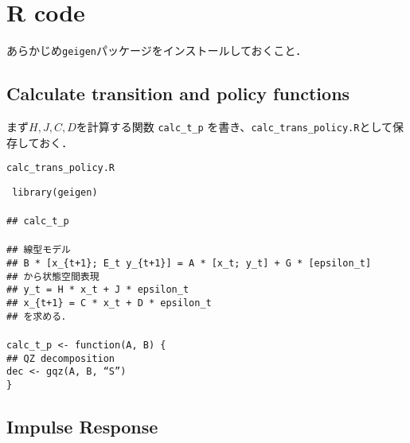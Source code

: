 \documentclass[a4j, dvipdfmx]{jarticle}
\begin{document}
\section{R code}

あらかじめ{\tt geigen}パッケージをインストールしておくこと．

\subsection{Calculate transition and policy functions}
まず$H,J,C,D$を計算する関数 {\tt calc\_t\_p} を書き、{\tt calc\_trans\_policy.R}として保存しておく．\\

\begin{itembox}[l]{{\tt calc\_trans\_policy.R}}

\noindent
{\tt
library(geigen)\\
\\
\#\# calc\_t\_p \\
\\
\#\# 線型モデル \\
\#\# B * [x\_\{t+1\}; E\_t y\_\{t+1\}] = A * [x\_t; y\_t] + G * [epsilon\_t] \\
\#\# から状態空間表現 \\
\#\# y\_t = H * x\_t + J * epsilon\_t \\
\#\# x\_\{t+1\} = C * x\_t + D * epsilon\_t\\
\#\# を求める．\\
\\
calc\_t\_p <- function(A, B) \{\\
\#\# QZ decomposition \\
dec <- gqz(A, B, ``S'')\\


\}
}

\end{itembox}

\subsection{Impulse Response}
\end{document}
